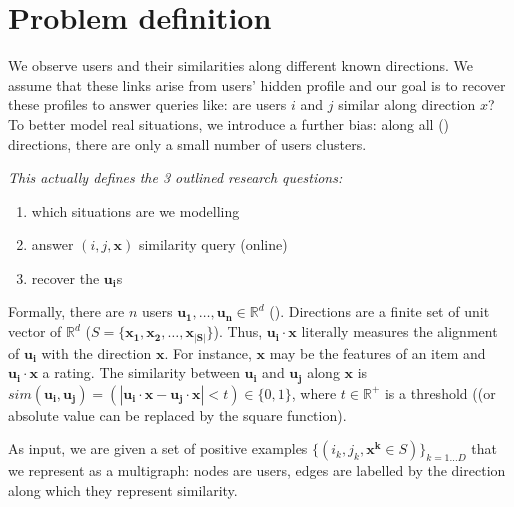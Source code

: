 \section{Problem definition}

We observe users and their similarities along different known directions. We
assume that these links arise from users' hidden profile and our goal is to
recover these profiles to answer queries like: are users $i$ and $j$ similar
along direction $x$? To better model real situations, we introduce a further
bias: along all () directions, there are only a small number
of users clusters.

\begin{center}
	\itshape\small
	This actually defines the 3 outlined research questions:
	\begin{enumerate}
		\item which situations are we modelling
		\item answer $(i,j,\bm{x})$ similarity query (online)
		\item recover the $\bm{u_i}$s
	\end{enumerate}
\end{center}

Formally, there are $n$ users $\bm{u_1}, \ldots, \bm{u_n} \in \mathbb{R}^d$
(). Directions are a finite set
of unit vector of $\mathbb{R}^d$ ($S=\{\bm{x_1}, \bm{x_2}, \ldots,
\bm{x_{|S|}}\}$). Thus, $\bm{u_i}\cdot \bm{x}$ literally measures the alignment
of $\bm{u_i}$ with the direction $\bm{x}$. For instance, $\bm{x}$ may be the
features of an item and $\bm{u_i}\cdot \bm{x}$ a rating. The similarity between
$\bm{u_i}$ and $\bm{u_j}$ along $\bm{x}$ is $sim(\bm{u_i}, \bm{u_j}) = \left( |
\bm{u_i} \cdot \bm{x} - \bm{u_j} \cdot \bm{x}| < t \right) \in \{0, 1\}$, where
$t \in \mathbb{R}^+$ is a threshold (\comment(or absolute value can be replaced
by the square function).

As input, we are given a set of positive examples $\{(i_k, j_k, \bm{x^k}\in
S)\}_{k=1\ldots D}$ that we represent as a multigraph: nodes are users, edges
are labelled by the direction along which they represent similarity.

%
%

